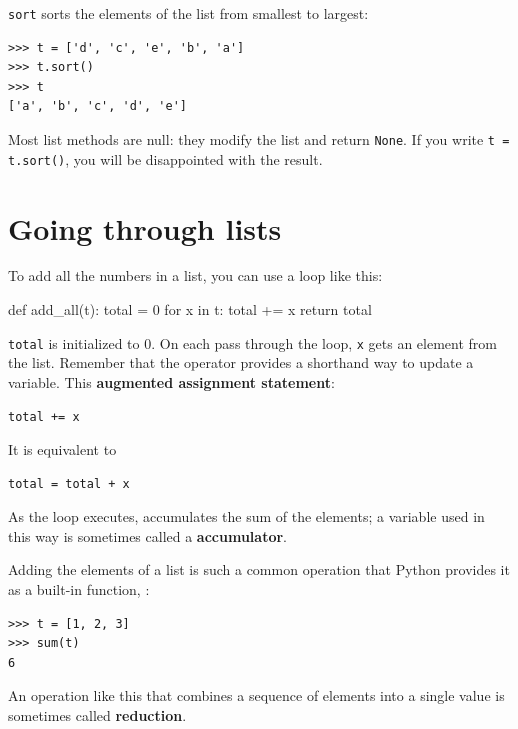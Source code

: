 \texttt{sort} sorts the elements of the list from smallest to largest:

\begin{Verbatim}[frame=single]
>>> t = ['d', 'c', 'e', 'b', 'a']
>>> t.sort()
>>> t
['a', 'b', 'c', 'd', 'e']
\end{Verbatim}
%
Most list methods are null: they modify the list and return \texttt{None}. If you write \texttt{t = t.sort()}, you will be disappointed with the result.


\section{Going through lists}
\label{filter}

To add all the numbers in a list, you can use a loop like this:

\begin{python}[frame=single]
def add_all(t):
    total = 0
    for x in t:
        total += x
    return total
\end{python}


\texttt{total} is initialized to 0. On each pass through the loop, \texttt{x} gets an element from the list. Remember that the \pythoninline{+=} operator provides a shorthand way to update a variable. This \textbf{augmented assignment statement}:

\begin{Verbatim}[frame=single]
total += x
\end{Verbatim}
%
It is equivalent to

\begin{Verbatim}[frame=single]
total = total + x
\end{Verbatim}
%
As the loop executes,  accumulates the sum of the elements; a variable used in this way is sometimes called a \textbf{ accumulator}.

Adding the elements of a list is such a common operation that Python provides it as a built-in function, :

\begin{Verbatim}[frame=single]
>>> t = [1, 2, 3]
>>> sum(t)
6
\end{Verbatim}
%
An operation like this that combines a sequence of elements into a single value is sometimes called \textbf{reduction}.

